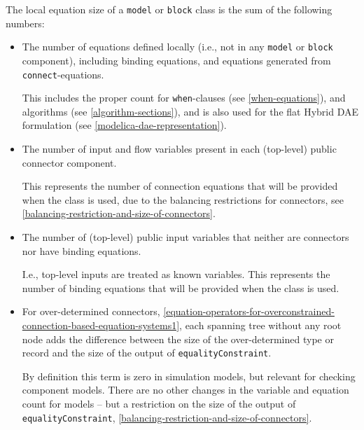 \begin{definition}
The local equation size of a \lstinline!model! or \lstinline!block! class is the sum of the following numbers:
\begin{itemize}
\item
  The number of equations defined locally (i.e., not in any \lstinline!model! or \lstinline!block! component), including binding equations, and equations generated from \lstinline!connect!-equations.
  \begin{nonnormative}
  This includes the proper count for \lstinline!when!-clauses (see \cref{when-equations}), and algorithms (see \cref{algorithm-sections}), and is also used for
  the flat Hybrid DAE formulation (see \cref{modelica-dae-representation}).
  \end{nonnormative}
\item
  The number of input and flow variables present in each (top-level) public connector component.
  \begin{nonnormative}
  This represents the number of connection equations that will be provided when the class is used, due to the balancing restrictions for connectors, see \cref{balancing-restriction-and-size-of-connectors}.
  \end{nonnormative}
\item
  The number of (top-level) public input variables that neither are connectors nor have binding equations.
  \begin{nonnormative}
  I.e., top-level inputs are treated as known variables.  This represents the number of binding equations that will be provided when the class is used.
  \end{nonnormative}
\item
  For over-determined connectors, \cref{equation-operators-for-overconstrained-connection-based-equation-systems1}, each spanning tree without any root node adds the difference between the size of the over-determined type or record and the size of the output of \lstinline!equalityConstraint!.
\begin{nonnormative}
  By definition this term is zero in simulation models, but relevant for checking component models.
  There are no other changes in the variable and equation count for models -- but a restriction on the size of the output of \lstinline!equalityConstraint!, \cref{balancing-restriction-and-size-of-connectors}.
\end{nonnormative}
\end{itemize}
\end{definition}

